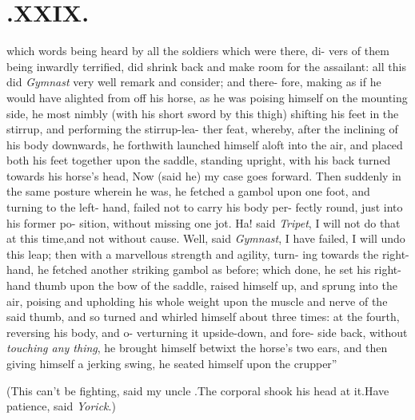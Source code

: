 \documentclass[twoside]{article}
\begin{document}
\section{.\enspace  XXIX.}

\quad\tsh\lqq which words being heard by\break
\lqq all the soldiers which were there, di-\break
\lqq vers of them being inwardly terrified,\break
\lqq did shrink back and make room for\break
\lqq the assailant: all this did \textit{Gymnast} very\break
\lqq well remark and consider; and there-\break
\lqq fore, making as if he would have\break
\lqq alighted from off his horse, as he was\break
\lqq poising himself on the mounting side,\break
\lqq he most nimbly (with his short sword\break
\lqq by this thigh) shifting his feet in the
\lqq stirrup, and performing the stirrup-lea-\break
\lqq ther feat, whereby, after the inclining\break
\lqq of his body downwards, he forthwith\break
\lqq launched himself aloft into the air, and\break
\lqq placed both his feet together upon the\break
\lqq saddle, standing upright, with his\break
\lqq back turned towards his horse’s head,\break
\lqq \tsk Now (said he) my case goes forward.\break
\lqq Then suddenly in the same posture\break
\lqq wherein he was, he fetched a gambol\break
\lqq upon one foot, and turning to the left-\break
\lqq hand, failed not to carry his body per-\break
\lqq fectly round, just into his former po-\break
\lqq sition, without missing one jot.\tsh\break
\lqq Ha!  said \textit{Tripet}, I will not do that\break
\lqq at this time,\tsk and not without cause.\break
\lqq Well, said \textit{Gymnast}, I have failed,\tsk\break
\lqq I will undo this leap; then with a\break
\lqq marvellous strength and agility, turn-\break
\lqq ing towards the right-hand, he fetched\break
\lqq another striking gambol as before;\break
\lqq which done, he set his right-hand\break
\lqq thumb upon the bow of the saddle,
\lqq raised himself up, and sprung into the\break
\lqq air, poising and upholding his whole\break
\lqq weight upon the muscle and nerve of\break
\lqq the said thumb, and so turned and\break
\lqq whirled himself about three times: at\break
\lqq the fourth, reversing his body, and o-\break
\lqq verturning it upside-down, and fore-\break
\lqq side back, without \textit{touching any thing},\break
\lqq he brought himself betwixt the horse’s\break
\lqq two ears, and then giving himself a\break
\lqq jerking swing, he seated himself upon\break
\lqq the crupper\tsh ”

(This can’t be fighting, said my uncle\break
\toby.\tsh The corporal shook his head\break
at it.\tsh Have patience, said \textit{Yorick}.)
\end{document}
